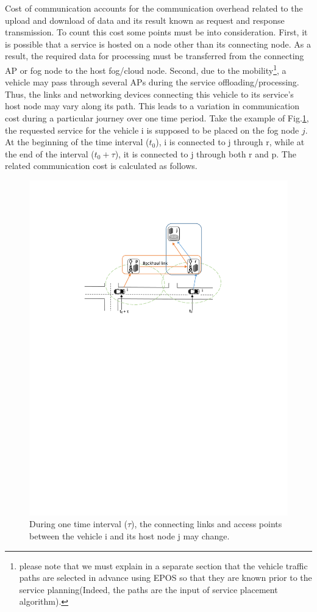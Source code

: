 \documentclass[twocolumn]{article}
\begin{document}
\par Cost of communication accounts for the communication overhead related to the upload and download of data and its result known as request and response transmission. To count this cost some points must be into consideration. First, it is possible that a service is hosted on a node other than its connecting node. As a result, the required data for processing must be transferred from the connecting AP or fog node to the host fog/cloud node. Second, due to the mobility\footnote{please note that we must explain in a separate section that the vehicle traffic paths are selected in advance using EPOS so that they are known prior to the service planning(Indeed, the paths are the input of service placement algorithm).}, a vehicle may pass through several APs during the service offloading/processing. Thus, the links and networking devices connecting this vehicle to its service's host node may vary along its path. This leads to a variation in communication cost during a particular journey over one time period. Take the example of Fig.\ref{fig:comm}, the requested service for the vehicle i is supposed to be placed on the fog node $j$. At the beginning of the time interval ($t_{0}$), i is connected to j through r, while at the end of the interval ($t_{0}+\tau$), it is connected to j through both r and p. The related communication cost is calculated as follows. 
\begin{figure}[!htbp]
\centering
\includegraphics[clip, trim=4.2cm 15.7cm 5.2cm 3.4cm, width=\columnwidth]{figures/pdf/fig2-v2.pdf}
\caption{During one time interval ($\tau$), the connecting links and access points between the vehicle i and its host node j may change.}
\label{fig:comm}
\end{figure}
\end{document}
